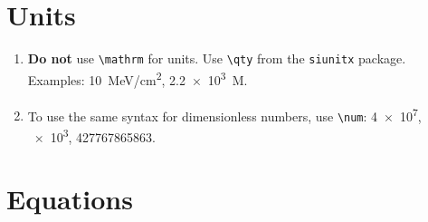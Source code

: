 \documentclass[
    prd, superscriptaddress, nofootinbib, amsmath, amssymb,
    aps, floatfix, preprintnumbers
]{revtex4-2}
\begin{document}
\section{Units}
\begin{enumerate}
    \item \textbf{Do not} use \verb|\mathrm| for units. Use \verb|\qty| from the \texttt{siunitx} package. Examples: \qty{10}{\mega\electronvolt/\centi\meter^2}, \qty{2.2e3}{M_\odot}.
    \item To use the same syntax for dimensionless numbers, use \verb|\num|: \num{4e7}, \num{e3}, \num{427767865863}.
\end{enumerate}

\section{Equations}
\end{document}
